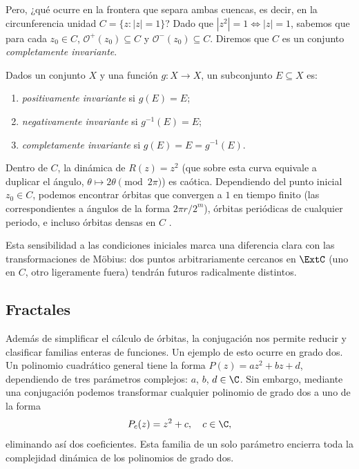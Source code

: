 
Pero, ¿qué ocurre en la frontera que separa ambas cuencas, es decir, en la
circunferencia unidad $C = \{z \colon |z| = 1\}$? Dado que $|z^2| = 1 \iff |z| =
1$, sabemos que para cada $z_0 \in C$, $\mathcal{O}^+(z_0) \subseteq C$ y
$\mathcal{O}^-(z_0) \subseteq C $. Diremos que $C$ es un conjunto
\emph{completamente invariante}.

\begin{definicion}
    Dados un conjunto $X$ y una función $g \colon X \to X$, un subconjunto $E
    \subseteq X$ es:
    \begin{enumerate}
        \item \emph{positivamente invariante} si $g(E) = E$;
        \item \emph{negativamente invariante} si $g^{-1}(E) = E$;
        \item \emph{completamente invariante} si $g(E) = E = g^{-1}(E)$.
    \end{enumerate}
\end{definicion}

Dentro de $C$, la dinámica de $R(z)=z^2$ (que sobre esta curva equivale a
duplicar el ángulo, $\theta \mapsto 2\theta \pmod{2\pi}$) es caótica.
Dependiendo del punto inicial $z_0 \in C$, podemos encontrar órbitas que
convergen a $1$ en tiempo finito (las correspondientes a ángulos de la forma
$2\pi r / 2^m$), órbitas periódicas de cualquier periodo, e incluso órbitas
densas en $C$ \cite[6--8]{Beardon1991}. 

Esta sensibilidad a las condiciones iniciales marca una diferencia clara con las
transformaciones de Möbius: dos puntos arbitrariamente cercanos en $\ExtC$ (uno
en $C$, otro ligeramente fuera) tendrán futuros radicalmente distintos.

\subsection{Fractales}
Además de simplificar el cálculo de órbitas, la conjugación nos permite reducir
y clasificar familias enteras de funciones. Un ejemplo de esto ocurre en grado
dos. Un polinomio cuadrático general tiene la forma $P(z) = az^2 + bz + d$,
dependiendo de tres parámetros complejos: $a$, $b$, $d \in \C$. Sin embargo,
mediante una conjugación podemos transformar cualquier polinomio de grado dos a
uno de la forma
\[
    P_c(z) = z^2 + c, \quad c \in \C,
\]
eliminando así dos coeficientes. Esta familia de un solo parámetro encierra toda
la complejidad dinámica de los polinomios de grado dos.

